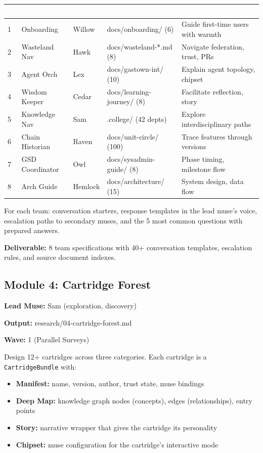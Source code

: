 \documentclass[11pt,letterpaper]{article}
\newcommand{\metafield}[2]{\textbf{\sffamily #1} #2\par}
\newcommand{\tableheader}[1]{\textbf{\sffamily\textcolor{white}{#1}}}
\begin{document}
\begin{center}
\begin{tabularx}{\textwidth}{C{0.5cm}L{2.3cm}L{1.3cm}L{2.5cm}X}
\toprule
{}
\tableheader{\#} & \tableheader{Team Name} & \tableheader{Lead} & \tableheader{Source Docs} & \tableheader{Purpose} \\
 & Onboarding & Willow & docs/onboarding/ (6) & Guide first-time users with warmth \\
2 & Wasteland Nav & Hawk & docs/wasteland-*.md (8) & Navigate federation, trust, PRs \\
3 & Agent Orch & Lex & docs/gastown-int/ (10) & Explain agent topology, chipset \\
4 & Wisdom Keeper & Cedar & docs/learning-journey/ (8) & Facilitate reflection, story \\
5 & Knowledge Nav & Sam & .college/ (42 depts) & Explore interdisciplinary paths \\
6 & Chain Historian & Raven & docs/unit-circle/ (100) & Trace features through versions \\
7 & GSD Coordinator & Owl & docs/sysadmin-guide/ (8) & Phase timing, milestone flow \\
8 & Arch Guide & Hemlock & docs/architecture/ (15) & System design, data flow \\
\bottomrule
\end{tabularx}
\end{center}

For each team: conversation starters, response templates in the lead muse's voice, escalation paths to secondary muses, and the 5 most common questions with prepared answers.

\textbf{Deliverable:} 8 team specifications with 40+ conversation templates, escalation rules, and source document indexes.

\subsection{Module 4: Cartridge Forest}

\metafield{Lead Muse:}{Sam (exploration, discovery)}
\metafield{Output:}{research/04-cartridge-forest.md}
\metafield{Wave:}{1 (Parallel Surveys)}

Design 12+ cartridges across three categories. Each cartridge is a \texttt{CartridgeBundle} with:

\begin{itemize}
\item \textbf{Manifest:} name, version, author, trust state, muse bindings
\item \textbf{Deep Map:} knowledge graph nodes (concepts), edges (relationships), entry points
\item \textbf{Story:} narrative wrapper that gives the cartridge its personality
\item \textbf{Chipset:} muse configuration for the cartridge's interactive mode
\end{itemize}
\end{document}
